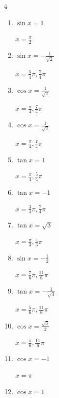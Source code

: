 \begin{multicols}{4}
\begin{enumerate}
\columnbreak %

  \item $\displaystyle \sin{x}  = 1$

        $\displaystyle x = \frac{\pi}{2}$

  \item $\displaystyle \sin{x}  = -\frac{1}{\sqrt{2}}$

        $\displaystyle x = \frac{5}{4}\pi , \frac{7}{4}\pi$

  \item $\displaystyle \cos{x}  = \frac{1}{\sqrt{2}}$

        $\displaystyle x = \frac{\pi}{4} , \frac{7}{4}\pi$

  \item $\displaystyle \cos{x}  = \frac{1}{\sqrt{2}}$

        $\displaystyle x = \frac{\pi}{4} , \frac{7}{4}\pi$

  \item $\displaystyle \tan{x}  = 1$

        $\displaystyle x = \frac{\pi}{4} , \frac{5}{4}\pi$

  \item $\displaystyle \tan{x}  = -1$

        $\displaystyle x = \frac{3}{4}\pi , \frac{7}{4}\pi$

  \item $\displaystyle \tan{x}  = \sqrt{3}$

        $\displaystyle x = \frac{\pi}{3} , \frac{4}{3}\pi$

  \item $\displaystyle \sin{x}  = -\frac{1}{2}$

        $\displaystyle x = \frac{7}{6}\pi , \frac{11}{6}\pi$

  \item $\displaystyle \tan{x}  = -\frac{1}{\sqrt{3}}$

        $\displaystyle x = \frac{5}{6}\pi , \frac{11}{6}\pi$

  \item $\displaystyle \cos{x}  = \frac{\sqrt{3}}{2}$

        $\displaystyle x = \frac{\pi}{6} , \frac{11}{6}\pi$

  \item $\displaystyle \cos{x}  = -1$

        $\displaystyle x = \pi$

  \item $\displaystyle \cos{x}  = 1$


\end{enumerate}
\end{multicols}
